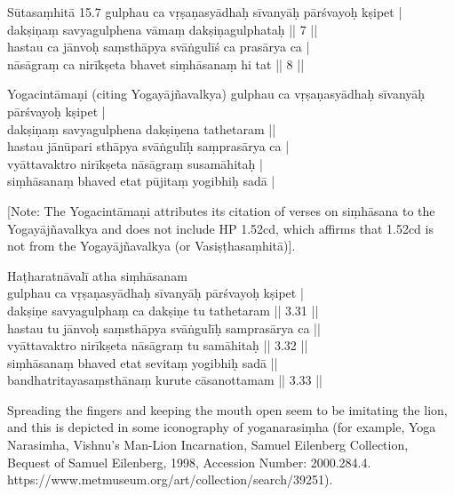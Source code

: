 \begin{ekdosis}
\begin{sources}[hp01_050]
Sūtasaṃhitā 15.7
\startverse
gulphau ca vṛṣaṇasyādhaḥ sīvanyāḥ pārśvayoḥ kṣipet |\\
dakṣiṇaṃ savyagulphena vāmaṃ dakṣiṇagulphataḥ || 7 ||\\
hastau ca jānvoḥ saṃsthāpya svāṅgulīś ca prasārya ca |\\
nāsāgraṃ ca nirīkṣeta bhavet siṃhāsanaṃ hi tat || 8 ||
\endverse
\end{sources}

\begin{testimonia}[hp01_050]
Yogacintāmaṇi (citing Yogayājñavalkya)
\startverse
gulphau ca vṛṣaṇasyādhaḥ sīvanyāḥ pārśvayoḥ kṣipet |\\
dakṣiṇaṃ savyagulphena dakṣiṇena tathetaram || \\
hastau jānūpari sthāpya svāṅgulīḥ saṃprasārya ca |\\
vyāttavaktro nirīkṣeta nāsāgraṃ susamāhitaḥ | \\
siṃhāsanaṃ bhaved etat pūjitaṃ yogibhiḥ sadā |
\endverse

[Note: The Yogacintāmaṇi attributes its citation of verses on siṃhāsana to the Yogayājñavalkya and does not include HP 1.52cd, which affirms that 1.52cd is not from the Yogayājñavalkya (or Vasiṣṭhasaṃhitā)].

Haṭharatnāvalī
\startverse
atha siṃhāsanam\\
gulphau ca vṛṣaṇasyādhaḥ sīvanyāḥ pārśvayoḥ kṣipet |\\
dakṣiṇe savyagulphaṃ ca dakṣiṇe tu tathetaram || 3.31 ||\\
hastau tu jānvoḥ saṃsthāpya svāṅgulīḥ samprasārya ca ||\\
vyāttavaktro nirīkṣeta nāsāgraṃ tu samāhitaḥ || 3.32 ||\\
siṃhāsanaṃ bhaved etat sevitaṃ yogibhiḥ sadā ||\\
bandhatritayasaṃsthānaṃ kurute cāsanottamam || 3.33 ||
\endverse
\end{testimonia}

\begin{philcomm}[hp01_050--052]
Spreading the fingers and keeping the mouth open seem to be imitating the lion, and this is depicted in some iconography of yoganarasiṃha (for example, Yoga Narasimha, Vishnu's Man-Lion Incarnation, Samuel Eilenberg Collection, Bequest of Samuel Eilenberg, 1998, Accession Number: 2000.284.4. https://www.metmuseum.org/art/collection/search/39251).  
\end{philcomm}


\end{ekdosis}
